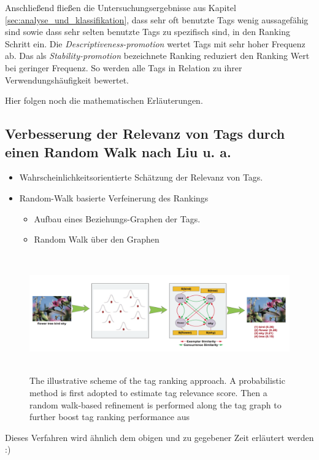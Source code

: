 Anschließend fließen die Untersuchungsergebnisse aus Kapitel \ref{sec:analyse_und_klassifikation}, dass sehr oft benutzte Tags wenig aussagefähig sind sowie dass sehr selten benutzte Tags zu spezifisch sind, in den Ranking Schritt ein. Die \emph{Descriptiveness-promotion} wertet Tags mit sehr hoher Frequenz ab. Das als \emph{Stability-promotion} bezeichnete Ranking reduziert den Ranking Wert bei geringer Frequenz. So werden alle Tags in Relation zu ihrer Verwendungshäufigkeit bewertet.

Hier folgen noch die mathematischen Erläuterungen.



\subsection{Verbesserung der Relevanz von Tags durch einen Random Walk nach Liu u. a.} %
\label{sub:verbesserung_der_relevanz_durch_einen_random_walk}

\begin{itemize}
  \item Wahrscheinlichkeitsorientierte Schätzung der Relevanz von Tags.
  \item Random-Walk basierte Verfeinerung des Rankings
    
    \begin{itemize}
      \item Aufbau eines Beziehungs-Graphen der Tags.
      \item Random Walk über den Graphen
    \end{itemize}
\end{itemize}

\begin{figure}[htbp]
  \centering
    \includegraphics[height=2in]{images/tag_ranking_verfahren.png}
  \caption{The illustrative scheme of the tag ranking approach. A probabilistic method is first adopted to estimate tag relevance score. Then a random walk-based refinement is performed along the tag graph to further boost tag ranking performance aus \cite{ranking}}
  \label{fig:images_tag_ranking_verfahren}
\end{figure}


Dieses Verfahren wird ähnlich dem obigen und zu gegebener Zeit erläutert werden :)

